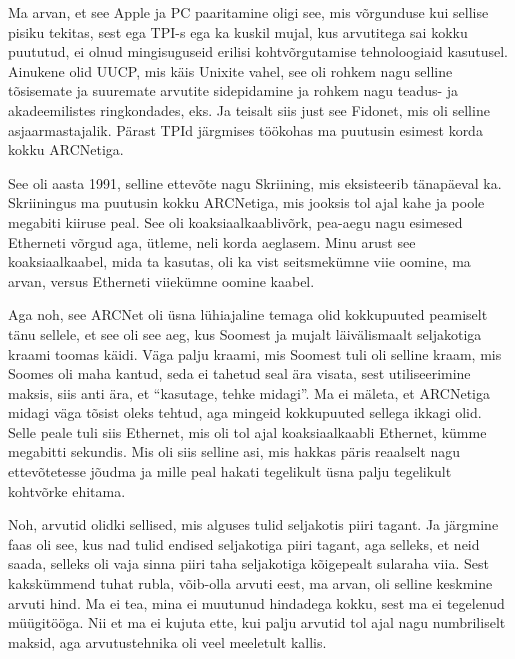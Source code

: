 Ma arvan, et see Apple ja PC paaritamine oligi see, mis  võrgunduse kui sellise pisiku tekitas, sest ega TPI-s ega ka kuskil mujal, kus arvutitega sai kokku puututud, ei olnud mingisuguseid erilisi kohtvõrgutamise tehnoloogiaid kasutusel. Ainukene olid UUCP, mis käis Unixite vahel, see oli rohkem nagu selline tõsisemate ja suuremate arvutite sidepidamine  ja rohkem nagu teadus- ja akadeemilistes ringkondades, eks. Ja teisalt siis just see Fidonet, mis oli selline asjaarmastajalik. Pärast TPId järgmises töökohas ma  puutusin esimest korda kokku ARCNetiga.


See oli  aasta 1991, selline ettevõte nagu Skriining, mis eksisteerib tänapäeval ka. Skriiningus ma puutusin kokku ARCNetiga, mis jooksis tol ajal kahe ja poole megabiti kiiruse peal. See oli koaksiaalkaablivõrk, pea-aegu nagu esimesed Etherneti võrgud aga, ütleme, neli korda aeglasem. Minu arust see koaksiaalkaabel, mida ta kasutas, oli ka vist seitsmekümne viie oomine, ma arvan, versus Etherneti viiekümne oomine kaabel. 

Aga noh, see ARCNet oli  üsna lühiajaline temaga olid kokkupuuted peamiselt  tänu sellele, et see oli see aeg, kus Soomest ja mujalt läivälismaalt seljakotiga kraami toomas käidi. Väga palju kraami, mis Soomest tuli oli selline kraam, mis Soomes oli maha kantud, seda ei tahetud seal ära visata, sest  utiliseerimine maksis, siis anti ära, et \enquote{kasutage, tehke midagi}. Ma ei mäleta, et ARCNetiga midagi väga tõsist oleks tehtud, aga mingeid kokkupuuted sellega ikkagi olid. Selle peale tuli siis Ethernet, mis oli tol ajal koaksiaalkaabli Ethernet, kümme megabitti sekundis. Mis oli siis selline asi, mis hakkas päris reaalselt nagu ettevõtetesse jõudma ja mille peal  hakati tegelikult üsna palju tegelikult kohtvõrke ehitama.


Noh, arvutid olidki sellised, mis alguses tulid seljakotis piiri tagant. Ja järgmine faas oli see, kus  nad tulid endised seljakotiga piiri tagant, aga selleks, et neid saada, selleks oli vaja sinna piiri taha seljakotiga kõigepealt sularaha viia. Sest kakskümmend tuhat rubla, võib-olla arvuti eest, ma arvan, oli selline keskmine arvuti hind. Ma ei tea, mina ei muutunud hindadega kokku, sest ma ei tegelenud müügitööga. Nii et ma ei kujuta ette, kui palju  arvutid tol ajal nagu numbriliselt maksid, aga arvutustehnika oli veel meeletult kallis.

